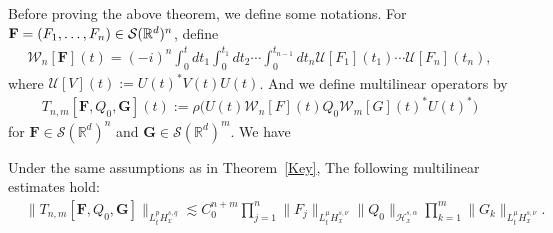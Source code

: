 \documentclass[AHL,Unicode,longabstracts,MathTools,published]{cedram}
\newcommand{\BR}{\mathbb{R}}
\newcommand{\vF}{{\mathbf{F}}}
\newcommand{\vG}{{\mathbf{G}}}
\newcommand{\CH}{\mathcal{H}}
\newcommand{\CS}{\mathcal{S}}
\newcommand{\CU}{\mathcal{U}}
\newcommand{\CW}{\mathcal{W}}
\newcommand{\al}{\alpha}
\newcommand{\rh}{\rho}
\newcommand{\ls}{\lesssim}
\begin{document}
Before proving the above theorem, we define some notations. For $\vF=(F_1,\dots, F_n) \linebreak\in \CS(\BR^d)^n$, define
\begin{align}
\CW_n [\vF](t) = (-i)^n \int_0^t dt_1 \int_0^{t_1} dt_2 \cdots \int_0^{t_{n-1}} dt_n
\CU[F_1](t_1) \cdots \CU[F_n](t_n),
\end{align}
where $\CU[V](t):= U(t)^*V(t)U(t)$. And we define multilinear operators by
\begin{align}
T_{n,m}[\vF,Q_0, \vG](t) := \rh \big( U(t)\CW_n[F](t) Q_0 \CW_m [G](t)^* U(t)^* \big)
\end{align}
for $\vF \in \CS(\BR^d)^n$ and $\vG \in \CS(\BR^d)^m$. We have

\begin{lemm}\label{muliti est}
Under the same assumptions as in Theorem~\ref{Key},
The following multilinear estimates hold:
\begin{align}
&\|T_{n,m} [\vF,Q_0,\vG]\|_{L^p_t H^{s,q}_x}
\ls C_0^{n+m}
\prod_{j=1}^n \|F_j\|_{L^{\mu}_t H^{s,\nu}_x}
\|Q_0\|_{\CH^{s,\al}_x}
\prod_{k=1}^m \|G_k\|_{L^{\mu}_t H^{s,\nu}_x}.
\end{align}
\end{lemm}
\end{document}
